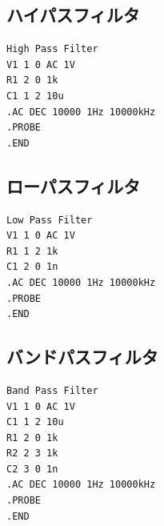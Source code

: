 \documentclass{jlreq}
\numberwithin{equation}{section}
\begin{document}
\subsection{ハイパスフィルタ}
\begin{verbatim}
High Pass Filter
V1 1 0 AC 1V
R1 2 0 1k
C1 1 2 10u
.AC DEC 10000 1Hz 10000kHz
.PROBE
.END
\end{verbatim}

\subsection{ローパスフィルタ}
\begin{verbatim}
Low Pass Filter
V1 1 0 AC 1V
R1 1 2 1k
C1 2 0 1n
.AC DEC 10000 1Hz 10000kHz
.PROBE
.END
\end{verbatim}

\subsection{バンドパスフィルタ}
\begin{verbatim}
Band Pass Filter
V1 1 0 AC 1V
C1 1 2 10u
R1 2 0 1k
R2 2 3 1k
C2 3 0 1n
.AC DEC 10000 1Hz 10000kHz
.PROBE
.END
\end{verbatim}
\end{document}
